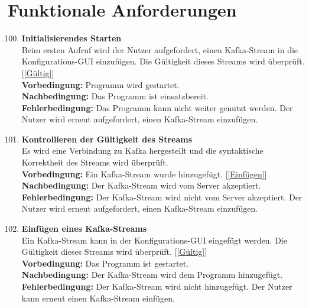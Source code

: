 \chapter{Funktionale Anforderungen}
\begin{enumerate}[label=\textbf{PF\arabic{enumi}0}]
	\setcounter{enumi}{99}
	\section{Pflichtanforderungen}
	\subsection{Server}

	\item \textbf{Initialisierendes Starten}\\
		Beim ersten Aufruf wird der Nutzer aufgefordert, einen Kafka-Stream in die Konfigurations-GUI einzufügen. Die Gültigkeit dieses Streams wird überprüft. [\ref{Gültig}]\\
		\textbf{Vorbedingung:} Programm wird gestartet.\\
		\textbf{Nachbedingung:} Das Programm ist einsatzbereit.\\
		\textbf{Fehlerbedingung:} Das Programm kann nicht weiter genutzt werden. Der Nutzer wird erneut aufgefordert, einen Kafka-Stream einzufügen.
	
	\item \textbf{Kontrollieren der Gültigkeit des Streams} \label{Gültig}\\
		Es wird eine Verbindung zu Kafka hergestellt und die syntaktische Korrektheit des Streams wird überprüft.\\
		\textbf{Vorbedingung:} Ein Kafka-Stream wurde hinzugefügt. [\ref{Einfügen}]\\
		\textbf{Nachbedingung:} Der Kafka-Stream wird vom Server akzeptiert.\\
		\textbf{Fehlerbedingung:} Der Kafka-Stream wird nicht vom Server akzeptiert. Der Nutzer wird erneut aufgefordert, einen Kafka-Stream einzufügen.
	
	\item \textbf{Einfügen eines Kafka-Streams} \label{Einfügen}\\
		Ein Kafka-Stream kann in der Konfigurations-GUI eingefügt werden. Die Gültigkeit dieses Streams wird überprüft. [\ref{Gültig}]\\
		\textbf{Vorbedingung:} Das Programm ist gestartet.\\
		\textbf{Nachbedingung:} Der Kafka-Stream wird dem Programm hinzugefügt.\\
		\textbf{Fehlerbedingung:} Der Kafka-Stream wird nicht hinzugefügt. Der Nutzer kann erneut einen Kafka-Stream einfügen.
		

\end{enumerate}
